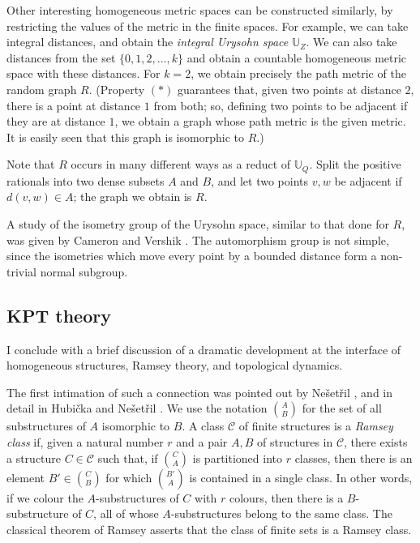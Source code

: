 \documentclass[12pt]{article}
\begin{document}
Other interesting homogeneous metric spaces can be constructed similarly,
by restricting the values of the metric in the finite spaces. For example,
we can take integral distances, and obtain the \emph{integral Urysohn space}
$\mathbb{U}_Z$. We can also take distances from the set $\{0,1,2,\ldots,k\}$
and obtain a countable homogeneous metric space with these distances. For
$k=2$, we obtain precisely the path metric of the random graph $R$. (Property
$(\ast)$ guarantees that, given two points at distance $2$, there is a point
at distance $1$ from both; so, defining two points to be adjacent if they are
at distance $1$, we obtain a graph whose path metric is the given metric. It
is easily seen that this graph is isomorphic to $R$.)

Note that $R$ occurs
in many different ways as a reduct of $\mathbb{U}_Q$. Split the positive
rationals into two dense subsets $A$ and $B$, and let two points $v,w$ be
adjacent if $d(v,w)\in A$; the graph we obtain is $R$.

A study of the isometry group of the Urysohn space, similar to that done for
$R$, was given by Cameron and Vershik \cite{ch32:new7}. The automorphism
group is not simple, since the isometries which move every point by a bounded
distance form a non-trivial normal subgroup.

\subsection{KPT theory}

I conclude with a brief discussion of a dramatic development at the interface
of homogeneous structures, Ramsey theory, and topological dynamics.

The first intimation of such a connection was pointed out by 
Ne\v{s}et\v{r}il \cite{ch32:new10}, and in detail in Hubi\v{c}ka and
Ne\v{s}et\v{r}il \cite{ch32:new9}. We use the notation $A\choose B$ for the
set of all substructures of $A$ isomorphic to $B$. A class $\mathcal{C}$ of
finite structures is a \emph{Ramsey class} if, given a natural number $r$ and
a pair $A,B$ of structures in $\mathcal{C}$, there exists a structure
$C\in\mathcal{C}$ such that, if $C\choose A$ is partitioned into $r$
classes, then there is an element $B'\in{C\choose B}$ for which $B'\choose A$
is contained in a single class. In other words, if we colour the
$A$-substructures of $C$ with $r$ colours, then there is a $B$-substructure
of $C$, all of whose $A$-substructures belong to the same class. The
classical theorem of Ramsey asserts that the class of finite sets is a
Ramsey class.
\end{document}
